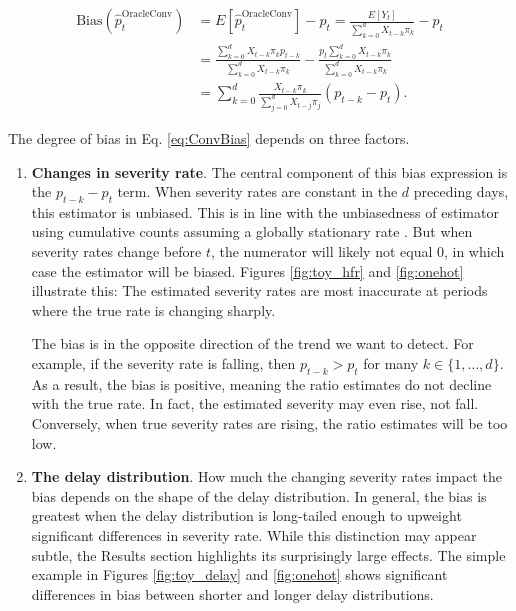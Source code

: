 \documentclass{article}
\begin{document}

\begin{align}\label{eq:ConvBias}
    \text{Bias}(\hat{p}_t^\text{OracleConv}) &= E[\hat{p}_t^\text{OracleConv}] - p_t = \frac{E[Y_t]}{\sum_{k=0}^d X_{t-k}\pi_k} - p_t \nonumber\\ 
    &= \frac{\sum_{k=0}^d X_{t-k}\pi_k p_{t-k}}{\sum_{k=0}^d X_{t-k}\pi_k} - \frac{p_t \sum_{k=0}^d X_{t-k}\pi_k}{\sum_{k=0}^d X_{t-k}\pi_k}\nonumber\\
    &= \sum_{k=0}^d \frac{X_{t-k}\pi_k}{\sum_{j=0}^d X_{t-j}\pi_j} (p_{t-k}-p_t).
\end{align}

The degree of bias in Eq. \ref{eq:ConvBias} depends on three factors.
\begin{enumerate}
    \item \textbf{Changes in severity rate}. The central component of this bias expression is the $p_{t-k}-p_t$ term. When severity rates are constant in the $d$ preceding days, this estimator is unbiased. This is in line with the unbiasedness of estimator using cumulative counts assuming a globally stationary rate \citep{nishiura}. But when severity rates change before $t$, the numerator will likely not equal 0, in which case the estimator will be biased. Figures \ref{fig:toy_hfr} and \ref{fig:onehot} illustrate this: The estimated severity rates are most inaccurate at periods where the true rate is changing sharply. 

The bias is in the opposite direction of the trend we want to detect. For example, if the severity rate is falling, then $p_{t-k} > p_t$ for many $k\in \{1, \ldots, d\}$. As a result, the bias is positive, meaning the ratio estimates do not decline with the true rate. In fact, the estimated severity may even rise, not fall. Conversely, when true severity rates are rising, the ratio estimates will be too low. %

    \item \textbf{The delay distribution}. How much the changing severity rates impact the bias depends on the shape of the delay distribution. In general, the bias is greatest when the delay distribution is long-tailed enough to upweight significant differences in severity rate. While this distinction may appear subtle, the Results section highlights its surprisingly large effects. The simple example in Figures \ref{fig:toy_delay} and \ref{fig:onehot} shows significant differences in bias between shorter and longer delay distributions. 


\end{enumerate}
\end{document}
